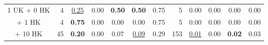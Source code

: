\begin{table*}[!ht]
{\begin{tabular}{c|rccccc|rcccc}
\hspace{1.1ex} 1 UK\hspace{0.5ex} + \hspace{0.5ex} 0 HK    & 4                              & \underline{0.25}                                                                 & 0.00                                                                        & \textbf{0.50}                                                             & \textbf{0.50}                                                              & 0.75                                                                           & 5                                                & 0.00                                                                        & 0.00                                                                      & 0.00                                                                       & 0.00                                                                          \\
 \hspace{7ex} + \hspace{0.5ex} 1 HK    & 4                                                & \textbf{0.75}                                                              & 0.00                                                                        & 0.00                                                                      & 0.00                                                                       & 0.75                                                                           & 5                                                & 0.00                                                                        & 0.00                                                                      & 0.00                                                                       & 0.00                                                                          \\
 \hspace{7ex} + 10 HK   & 45                                               & \textbf{0.20}                                                              & 0.00                                                                        & 0.07                                                                      & \underline{0.09}                                                                 & 0.29                                                                           & 153                                              & \underline{0.01}                                                                  & 0.00                                                                      & \textbf{0.02}                                                              & 0.03                                                                          \\

\end{tabular}}
\end{table*}
